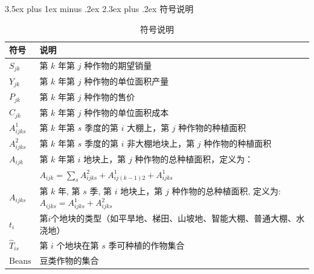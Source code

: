 \documentclass[12pt,a4paper]{nmmcm}
\makeatletter
\renewcommand\section{\@startsection{section}{1}{0pt}%
    {3.5ex plus 1ex minus .2ex}%
    {2.3ex plus .2ex}%
    {\normalfont\LARGE\bfseries}}
\makeatother
\begin{document}
\section{符号说明}
\begin{table}[htbp]
  \centering
  \caption{符号说明}
  \renewcommand{\arraystretch}{1.2}
  \setlength{\tabcolsep}{10pt}
  \begin{tabular}{p{3cm} | p{10cm}}
    \hline
    \hline
    \textbf{符号}       & \textbf{说明}                                                                           \\
    \hline
    $S_{jk}$          & 第 $k$ 年第 $j$ 种作物的期望销量                                                                  \\
    $Y_{jk}$          & 第 $k$ 年第 $j$ 种作物的单位面积产量                                                                \\
    $P_{jk}$          & 第 $k$ 年第 $j$ 种作物的售价                                                                    \\
    $C_{jk}$          & 第 $k$ 年第 $j$ 种作物的单位面积成本                                                                \\
    $A^1_{ijks}$      & 第 $k$ 年第 $s$ 季度的第 $i$ 大棚上，第 $j$ 种作物的种植面积                                               \\
    $A^2_{ijks}$      & 第 $k$ 年第 $s$ 季度的第 $i$ 非大棚地块上，第 $j$ 种作物的种植面积                                            \\
    $A_{ijk}$         & 第 $k$ 年第 $i$ 地块上，第 $j$ 种作物的总种植面积，定义为：                                                  \\
                      & $A_{ijk} = \sum_s A^2_{ijks} + A^1_{ij(k-1)2} + A^1_{ijks}$                           \\
    $A_{ijks}$        & 第 $k$ 年, 第 $s$ 季, 第 $i$ 地块上，第 $j$ 种作物的总种植面积, 定义为: $A_{ijks} = A^1_{ijks} + A^2_{ijks}$ \\
    $t_i$             & 第$i$个地块的类型（如平旱地、梯田、山坡地、智能大棚、普通大棚、水浇地）                                                 \\
    $\hat{T}_{is}$    & 第 $i$ 个地块在第 $s$ 季可种植的作物集合                                                             \\
    $\text{Beans}$    & 豆类作物的集合                                                                               \\

\end{tabular}
\end{table}
\end{document}
